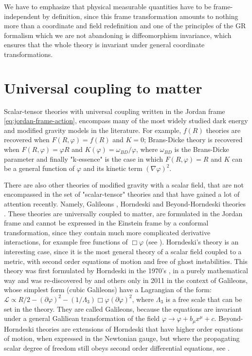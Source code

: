 We have to emphasize that physical measurable quantities have to be frame-independent by definition,
since this frame transformation amounts to nothing more than a coordinate and field redefinition 
and one of the principles of the GR formalism which we are not abandoning
is diffeomorphism invariance, which ensures that 
the whole theory is invariant under general coordinate transformations.


\section{Universal coupling to matter \label{sec:universal-coupling}}

Scalar-tensor theories with universal coupling written in the Jordan frame \cref{eq:jordan-frame-action}, 
encompass many of the most widely studied dark energy and modified gravity models in the literature. 
For example, $f(R)$ theories \cite{cite, many, f(R), theories} are recovered when $F(R,\varphi) = f(R)$ and $K=0$;
Brans-Dicke theory \cite{cite Brans Dicke, and, many, others} is recovered when $F(R,\varphi) = \varphi R $ and 
$K(\varphi) = \omega_{BD}/\varphi$, where $\omega_{BD}$ is the Brans-Dicke parameter and finally "k-essence" 
\cite{cite, Luca, and, some, kessence} is the case in which $F(R,\varphi) = R$ and $K$ can be a general
function of $\varphi$ and its kinetic term $(\nabla \varphi)^2$. 

There are also other theories of modified gravity with a scalar field, that are not encompassed in the set of "scalar-tensor"
theories and that have gained a lot of attention recently. Namely, Galileons \cite{cite}, Horndeski \cite{cite} 
and Beyond-Horndeski theories \cite{cite}. These theories are universally coupled to matter, are formulated
in the Jordan frame and cannot be expressed in the Einstein frame by a conformal transformation, since they contain much more complicated
derivative interactions, for example free functions of $\Box \varphi$ (see \cite{cite Zuma, Defayyet, Sawicki, Bellini}).
Horndeski's theory is an interesting case, since it is the most general theory of 
a scalar field coupled to a metric, with second order equations of motion and free of ghost instabilities. 
This theory was first formulated by Horndeski in the 1970's \cite{Horndeski}, in a purely mathematical way and was re-discovered by \cite{Defayett}
and others only in 2011 in the context of Galileons, whose simplest form (cubic Galileons) have a Lagrangian of the form:
$\mathcal{L} \propto R/2 - (\partial \varphi)^2 - (1/\Lambda_3)\Box \varphi (\partial \varphi)^2$, 
where $ \Lambda_3 $ is a free scale that can be set in the theory. They are called Galileons, 
because the equations are invariant under a general Galiliean transformation of the field $\varphi \rightarrow \varphi + b_\mu x^\mu +c$.
Beyond-Horndeski theories are extensions of Horndeski that have higher order equations of motion, when expressed 
in the Newtonian gauge, but where the propagating scalar degree of freedom still obeys second order differential equations, see
\cite{cite Langlois, Gleyzes, Zuma}.


